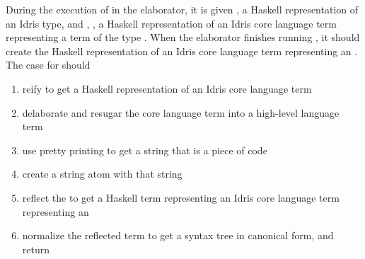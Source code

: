 During the execution of  in the elaborator, it is given
, a Haskell representation of an Idris type, and ,
, a Haskell representation of an Idris core language term representing
a term of the type .
When the elaborator finishes running , it should create
the Haskell representation of an Idris core language term representing an
\sexp{}. The \TT{} case for  should

\begin{enumerate}
  \item reify  to get a Haskell representation of an Idris core language term
  \item delaborate and resugar the core language term into a high-level language term
  \item use pretty printing to get a string that is a piece of code
  \item create a string atom \sexp{} with that string
  \item reflect the \sexp{} to get a Haskell term representing an Idris core language term representing an \sexp{}
  \item normalize the reflected term to get a syntax tree in canonical form, and return
\end{enumerate}

